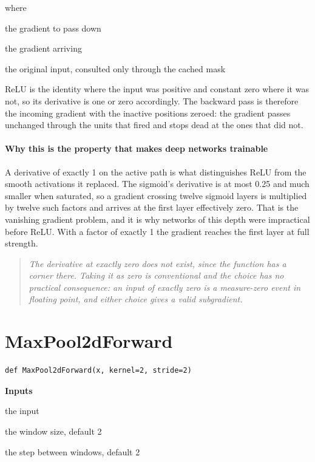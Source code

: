 \noindent where
\begin{description}[leftmargin=2.4em,style=nextline,font=\normalfont\ttfamily]\setlength\itemsep{1pt}
  \item[{$\frac{\partial L}{\partial x}$}] \normalfont the gradient to pass down
  \item[{$\frac{\partial L}{\partial y}$}] \normalfont the gradient arriving
  \item[{$x$}] \normalfont the original input, consulted only through the cached mask
\end{description}
ReLU is the identity where the input was positive and constant zero where it was not, so its derivative is one or zero accordingly. The backward pass is therefore the incoming gradient with the inactive positions zeroed: the gradient passes unchanged through the units that fired and stops dead at the ones that did not.


\paragraph{Why this is the property that makes deep networks trainable}
A derivative of exactly 1 on the active path is what distinguishes ReLU from the smooth activations it replaced. The sigmoid's derivative is at most 0.25 and much smaller when saturated, so a gradient crossing twelve sigmoid layers is multiplied by twelve such factors and arrives at the first layer effectively zero. That is the vanishing gradient problem, and it is why networks of this depth were impractical before ReLU. With a factor of exactly 1 the gradient reaches the first layer at full strength.


\begin{quote}\small\itshape The derivative at exactly zero does not exist, since the function has a corner there. Taking it as zero is conventional and the choice has no practical consequence: an input of exactly zero is a measure-zero event in floating point, and either choice gives a valid subgradient.\end{quote}

\section{MaxPool2dForward}
\begin{lstlisting}[style=sig]
def MaxPool2dForward(x, kernel=2, stride=2)
\end{lstlisting}

\noindent\textbf{Inputs}
\begin{description}[leftmargin=2.2em,style=nextline,font=\normalfont\ttfamily]\setlength\itemsep{1pt}
  \item[{x}] \normalfont the input
  \item[{kernel}] \normalfont the window size, default 2
  \item[{stride}] \normalfont the step between windows, default 2
\end{description}

